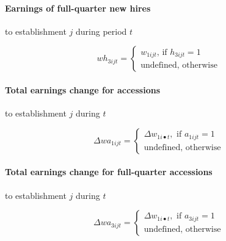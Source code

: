 \paragraph{Earnings of full-quarter new hires}

 

to establishment $j$ during period $t$

\begin{equation}
wh_{3ijt}=\left\{ 
\begin{array}{l}
{w_{1ijt} \mbox{, if }h_{3ijt} = 1} \\ 
{\mbox{undefined, otherwise}}%
\end{array}%
\right.
\end{equation}

\paragraph{Total earnings change for accessions}

 

to establishment $j$ during $t$

\begin{equation}
\Delta wa_{1ijt} = \left\{ 
\begin{array}{l}
{\Delta w_{1i\bullet t},\mbox{ if }a_{1ijt} = 1} \\ 
{\mbox{undefined, otherwise}}%
\end{array}
\right.
\end{equation}

\paragraph{Total earnings change for full-quarter accessions}

 

to establishment $j$ during $t$

\begin{equation}
\Delta wa_{3ijt} = \left\{ 
\begin{array}{l}
{\Delta w_{1i\bullet t} ,\mbox{ if }a_{3ijt} = 1} \\ 
{\mbox{undefined, otherwise}}%
\end{array}%
\right.
\end{equation}

